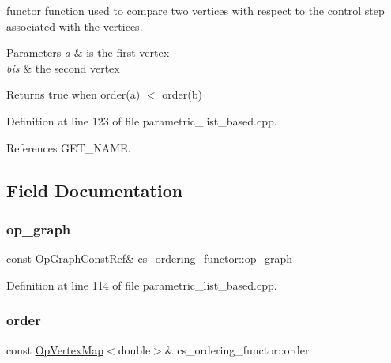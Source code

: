 functor function used to compare two vertices with respect to the control step associated with the vertices. 


\begin{DoxyParams}{Parameters}
{\em a} & is the first vertex \\
\hline
{\em bis} & the second vertex \\
\hline
\end{DoxyParams}
\begin{DoxyReturn}{Returns}
true when order(a) $<$ order(b) 
\end{DoxyReturn}


Definition at line 123 of file parametric\+\_\+list\+\_\+based.\+cpp.



References G\+E\+T\+\_\+\+N\+A\+ME.



\subsection{Field Documentation}
\mbox{\label{structcs__ordering__functor_a658ddd6a7cb202fa156621e964450aa2}} 
\subsubsection{\texorpdfstring{op\+\_\+graph}{op\_graph}}
{\footnotesize\ttfamily const \hyperlink{op__graph_8hpp_a9a0b240622c47584bee6951a6f5de746}{Op\+Graph\+Const\+Ref}\& cs\+\_\+ordering\+\_\+functor\+::op\+\_\+graph\hspace{0.3cm}{\ttfamily [private]}}



Definition at line 114 of file parametric\+\_\+list\+\_\+based.\+cpp.

\mbox{\label{structcs__ordering__functor_ac71c00993ded0112622e5fe35adec653}} 
\subsubsection{\texorpdfstring{order}{order}}
{\footnotesize\ttfamily const \hyperlink{classOpVertexMap}{Op\+Vertex\+Map}$<$double$>$\& cs\+\_\+ordering\+\_\+functor\+::order\hspace{0.3cm}{\ttfamily [private]}}



